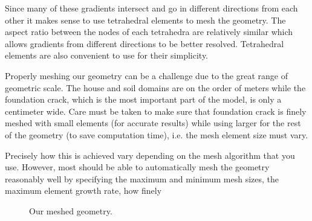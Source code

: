 Since many of these gradients intersect and go in different directions from each other it makes sense to use tetrahedral elements to mesh the geometry.
The aspect ratio between the nodes of each tetrahedra are relatively similar which allows gradients from different directions to be better resolved.
Tetrahedral elements are also convenient to use for their simplicity.\par

Properly meshing our geometry can be a challenge due to the great range of geometric scale.
The house and soil domains are on the order of meters while the foundation crack, which is the most important part of the model, is only a centimeter wide.
Care must be taken to make sure that foundation crack is finely meshed with small elements (for accurate results) while using larger for the rest of the geometry (to save computation time), i.e. the mesh element size must vary.\par

Precisely how this is achieved vary depending on the mesh algorithm that you use.
However, most should be able to automatically mesh the geometry reasonably well by specifying the maximum and minimum mesh sizes, the maximum element growth rate, how finely


\begin{figure}[htb!]
  \caption{Our meshed geometry.}
  \label{fig:meshed_geometry}
\end{figure}
